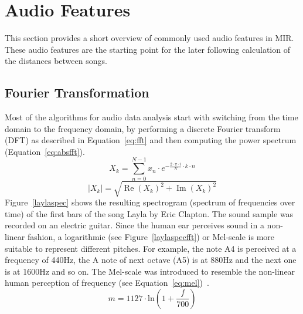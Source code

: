 \section{Audio Features}\label{featsec2}

This section provides a short overview of commonly used audio features in MIR. These audio features are the starting point for the later following calculation of the distances between songs.

\subsection{Fourier Transformation}\label{featsec}

Most of the algorithms for audio data analysis start with switching from the time domain to the frequency domain, by performing a discrete Fourier transform (DFT) as described in Equation~\eqref{eq:fft} and then computing the power spectrum (Equation~\eqref{eq:absfft}).
\begin{equation} \label{eq:fft}
X_k = \sum_{n=0}^{N-1}{x_n \cdot e^ { - \frac{ 2 \cdot \pi \cdot i}{N}\cdot k\cdot n}}
\end{equation}
\begin{equation} \label{eq:absfft}
|X_k| = \sqrt{\operatorname{Re}(X_k)^2 + \operatorname{Im}(X_k)^2}
\end{equation}
Figure~\ref{laylaspec} shows the resulting spectrogram (spectrum of frequencies over time) of the first bars of the song Layla by Eric Clapton. The sound sample was recorded on an electric guitar. Since the human ear perceives sound in a non-linear fashion, a logarithmic (see Figure~\ref{laylaspecfft}) or Mel-scale is more suitable to represent different pitches. For example, the note A4 is perceived at a frequency of 440Hz, the A note of next octave (A5) is at 880Hz and the next one is at 1600Hz and so on. The Mel-scale was introduced to resemble the non-linear human perception of frequency (see Equation~\eqref{eq:mel})~\cite[pp. 53f]{knees1}.
\begin{equation} \label{eq:mel}
m = 1127 \cdot \text{ln}(1 + \frac{f}{700})
\end{equation}
